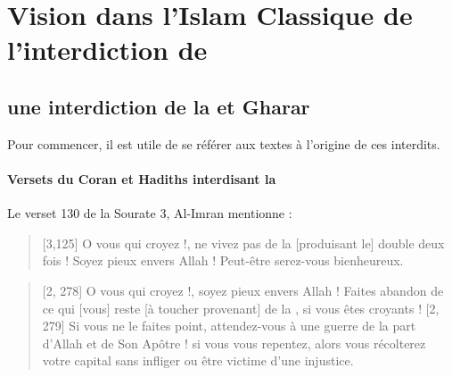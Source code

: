 \section{Vision dans l'Islam Classique de l'interdiction de \riba}

\subsection{une interdiction de la \riba et Gharar}

Pour commencer, il est utile de se référer aux textes à l'origine de ces interdits.
\paragraph{Versets du Coran et Hadiths interdisant la \riba}
Le verset 130 de la Sourate 3, Al-Imran mentionne : 
\vocalize %
\transtrue %
\arabtrue %
\begin{quote}
 
   [3,125] O vous qui croyez !, ne vivez pas de la \textit{\riba} [produisant le] double deux fois ! Soyez pieux envers Allah ! Peut-être serez-vous bienheureux. 

\end{quote}
\begin{quote}
 [2, 278] O vous qui croyez !, soyez pieux envers Allah ! Faites abandon de ce qui [vous] reste [à toucher provenant] de la \textit{\riba}, si vous êtes croyants !
[2, 279] Si vous ne le faites point, attendez-vous à une guerre de la part d’Allah et de Son Apôtre ! si vous vous repentez, alors vous récolterez votre capital sans infliger ou être victime d’une injustice. 

\end{quote}

